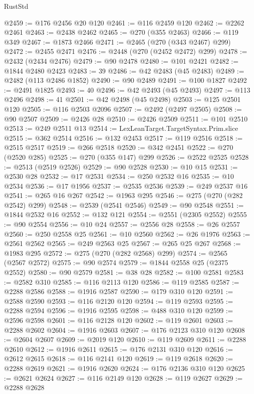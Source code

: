\begin{lexlean}{RustStd}
\begin{coremodule}
@2459 := @176 @2456 @20 @120
@2461 := @116 @2459 @120
@2462 := @2262 @2461
@2463 := @2438 @2462
@2465 := @270 (@355 @2463)
@2466 := @119 @349
@2467 := @1873 @2466
@2471 := @2465 (@270 (@343 @2467) @299)
@2472 := @2455 @2471
@2476 := @2448 (@270 (@2452 @2472) @299)
@2478 := @2432 (@2434 @2476)
@2479 := @90 @2478
@2480 := @101 @2421
@2482 := @1844 @2480 @2423
@2483 := 39
@2486 := @42 @2483 (@45 @2483)
@2489 := @2482 (@113 @2486 @1852)
@2490 := @90 @2489
@2491 := @100 @1827
@2492 := @2491 @1825
@2493 := 40
@2496 := @42 @2493 (@45 @2493)
@2497 := @113 @2496
@2498 := 41
@2501 := @42 @2498 (@45 @2498)
@2503 := @125 @2501 @120
@2505 := @116 @2503 @2096
@2507 := @2492 (@2497 @2505)
@2508 := @90 @2507
@2509 := @2426 @28
@2510 := @2426 @2509
@2511 := @101 @2510
@2513 := @249 @2511 @13
@2514 := LexLeanTarget.TargetSyntax.Prim.slice
@2515 := @362 @2514
@2516 := @132 @2453
@2517 := @119 @2516
@2518 := @2515 @2517
@2519 := @266 @2518
@2520 := @342 @2451
@2522 := @270 (@2520 @285)
@2525 := @270 (@355 @147) @299
@2526 := @2522 @2525
@2528 := @2513 (@2519 @2526)
@2529 := @90 @2528
@2530 := @10 @15
@2531 := @2530 @28
@2532 := @17 @2531
@2534 := @250 @2532 @16
@2535 := @10 @2534
@2536 := @17 @1956
@2537 := @2535 @2536
@2539 := @249 @2537 @16
@2541 := @265 @16 @267
@2542 := @1963 @295
@2546 := @275 (@270 (@282 @2542) @299)
@2548 := @2539 (@2541 @2546)
@2549 := @90 @2548
@2551 := @1844 @2532 @16
@2552 := @132 @121
@2554 := @2551 (@2305 @2552)
@2555 := @90 @2554
@2556 := @10 @24
@2557 := @2556 @28
@2558 := @26 @2557
@2560 := @250 @2558 @25
@2561 := @10 @2560
@2562 := @26 @1976
@2563 := @2561 @2562
@2565 := @249 @2563 @25
@2567 := @265 @25 @267
@2568 := @1983 @295
@2572 := @275 (@270 (@282 @2568) @299)
@2574 := @2565 (@2567 @2572)
@2575 := @90 @2574
@2579 := @1844 @2558 @25 (@2375 @2552)
@2580 := @90 @2579
@2581 := @38 @28
@2582 := @100 @2581
@2583 := @2582 @310
@2585 := @116 @2113 @120
@2586 := @119 @2585
@2587 := @2288 @2586
@2588 := @1916 @2587
@2590 := @179 @310 @120
@2591 := @2588 @2590
@2593 := @116 @2120 @120
@2594 := @119 @2593
@2595 := @2288 @2594
@2596 := @1916 @2595
@2598 := @488 @310 @120
@2599 := @2596 @2598
@2601 := @116 @2128 @120
@2602 := @119 @2601
@2603 := @2288 @2602
@2604 := @1916 @2603
@2607 := @176 @2123 @310 @120
@2608 := @2604 @2607
@2609 := @2019 @120
@2610 := @119 @2609
@2611 := @2288 @2610
@2612 := @1916 @2611
@2615 := @176 @2131 @310 @120
@2616 := @2612 @2615
@2618 := @116 @2141 @120
@2619 := @119 @2618
@2620 := @2288 @2619
@2621 := @1916 @2620
@2624 := @176 @2136 @310 @120
@2625 := @2621 @2624
@2627 := @116 @2149 @120
@2628 := @119 @2627
@2629 := @2288 @2628

\end{coremodule}
\end{lexlean}
